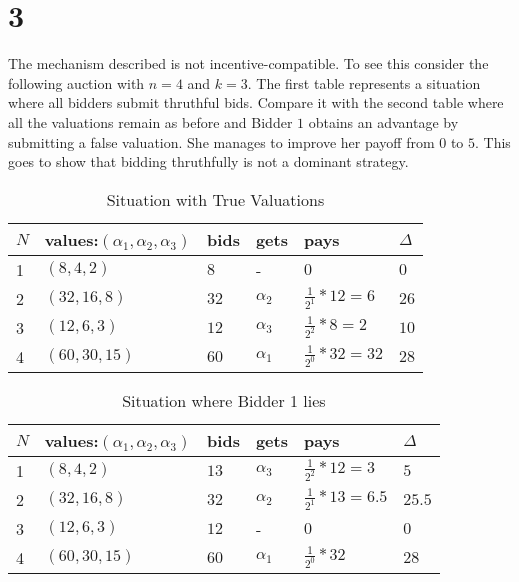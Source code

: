 \documentclass[10pt,a4paper]{article}
\begin{document}
\section*{3}
The mechanism described is not incentive-compatible. To see this consider the following auction with $n=4$ and $k=3$. The first table represents a situation where all bidders submit thruthful bids. Compare it with the second table where all the valuations remain as before and Bidder $1$ obtains an advantage by submitting a false valuation. She manages to improve her payoff from $0$ to $5$. This goes to show that bidding thruthfully is not a dominant strategy.
\begin{table}[h]
\centering
\caption{Situation with True Valuations}
\begin{tabular}{|l|l|l|l|l|l|}
\hline
$N$ & values:$(\alpha_1,\alpha_2,\alpha_3)$ & bids & gets       & pays                & $\Delta$ \\ \hline
1 & $(8,4,2)$                                & $8$    & -          & $0$                   & $0$        \\ \hline
2 & $(32,16,8)$                              & $32$   & $\alpha_2$ & $\tfrac{1}{2^1}*12=6$ & $26$       \\ \hline
3 & $(12,6,3)$                               & $12$   & $\alpha_3$ & $\tfrac{1}{2^2}*8=2$  & $10$       \\ \hline
4 & $(60,30,15)$                             & $60$   & $\alpha_1$ & $\tfrac{1}{2^0}*32=32$ & $28$       \\ \hline
\end{tabular}
\end{table}
\begin{table}[h]
\centering
\caption{Situation where Bidder 1 lies}
\begin{tabular}{|l|l|l|l|l|l|}
\hline
$N$ & values:$(\alpha_1,\alpha_2,\alpha_3)$ & bids & gets       & pays                & $\Delta$ \\ \hline
1 & $(8,4,2)$                                & $13$    & $\alpha_3$& $\tfrac{1}{2^2}*12=3$  & $5$     \\ \hline
2 & $(32,16,8)$                              & $32$   & $\alpha_2$ & $\tfrac{1}{2^1}*13=6.5$ & $25.5$       \\ \hline
3 & $(12,6,3)$                               & $12$   & -			 & $0$  					& $0$       \\ \hline
4 & $(60,30,15)$                             & $60$   & $\alpha_1$ & $\tfrac{1}{2^0}*32$ & $28$       \\ \hline
\end{tabular}
\end{table}
\end{document}

